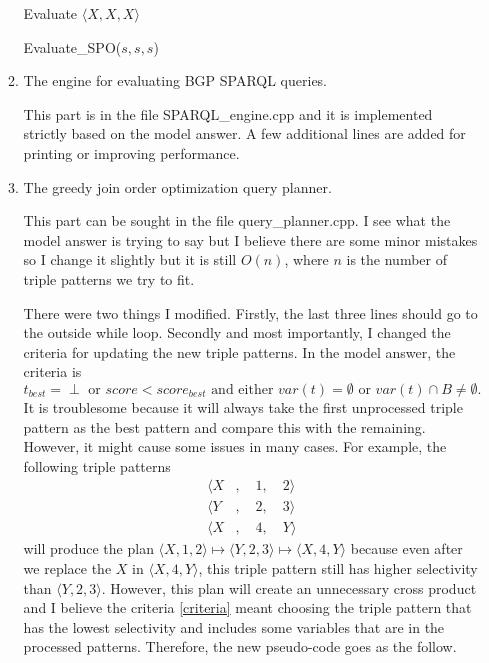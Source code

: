 \documentclass{article}
\begin{document}
\begin{enumerate}
\begin{enumerate}
\begin{algorithm}[H]
\caption{Evaluate $\langle X, X, X\rangle$}\label{alg:evaluateXXX}
\begin{algorithmic}
\State Evaluate\_SPO($s, s, s$) 
\EndFor
\end{algorithmic}
\end{algorithm}

\item The engine for evaluating BGP SPARQL queries.

This part is in the file SPARQL\_engine.cpp and it is implemented strictly based on the model answer. A few additional lines are added for printing or improving performance.

\item The greedy join order optimization query planner.

This part can be sought in the file query\_planner.cpp. I see what the model answer is trying to say but I believe there are some minor mistakes so I change it slightly but it is still $O(n)$, where $n$ is the number of triple patterns we try to fit. 

There were two things I modified. Firstly, the last three lines should go to the outside while loop. Secondly and most importantly, I changed the criteria for updating the new triple patterns. In the model answer, the criteria is 
\begin{equation}\label{criteria}
	t_{best} = \perp \text{ or } score < score_{best} \text{ and either } var(t) = \emptyset \text{ or } var(t) \cap B \neq \emptyset.
\end{equation}
It is troublesome because it will always take the first unprocessed triple pattern as the best pattern and compare this with the remaining. However, it might cause some issues in many cases. For example, the following triple patterns 
\begin{align*}
	\langle X &,\quad 1,\quad 2\rangle \\
	\langle Y &,\quad 2,\quad 3\rangle\\
	\langle X &,\quad 4,\quad Y\rangle
\end{align*}
will produce the plan $\langle X, 1, 2\rangle \mapsto \langle Y, 2, 3\rangle \mapsto \langle X, 4, Y\rangle$ because even after we replace the $X$ in $\langle X, 4, Y\rangle$, this triple pattern still has higher selectivity than $\langle Y, 2, 3\rangle$. However, this plan will create an unnecessary cross product and I believe the criteria \eqref{criteria} meant choosing the triple pattern that has the lowest selectivity and includes some variables that are in the  processed patterns. Therefore, the new pseudo-code goes as the follow. 


\end{enumerate}
\end{enumerate}
\end{document}
